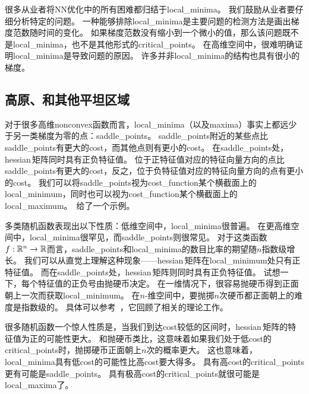 很多从业者将\gls{NN}优化中的所有困难都归结于\gls{local_minima}。
我们鼓励从业者要仔细分析特定的问题。
一种能够排除\gls{local_minima}是主要问题的检测方法是画出梯度范数随时间的变化。
如果梯度范数没有缩小到一个微小的值，那么该问题既不是\gls{local_minima}，也不是其他形式的\gls{critical_points}。
在高维空间中，很难明确证明\gls{local_minima}是导致问题的原因。
许多并非\gls{local_minima}的结构也具有很小的梯度。

\subsection{高原、和其他平坦区域}
\label{sec:plateaus_saddle_points_and_other_flat_regions}
对于很多高维\gls{nonconvex}函数而言，\gls{local_minima}（以及\gls{maxima}）事实上都远少于另一类梯度为零的点：\gls{saddle_points}。
\gls{saddle_points}附近的某些点比\gls{saddle_points}有更大的\gls{cost}，而其他点则有更小的\gls{cost}。
在\gls{saddle_points}处，\gls{hessian}\,矩阵同时具有正负特征值。
位于正特征值对应的特征向量方向的点比\gls{saddle_points}有更大的\gls{cost}，反之，位于负特征值对应的特征向量方向的点有更小的\gls{cost}。
我们可以将\gls{saddle_points}视为\gls{cost_function}某个横截面上的\gls{local_minimum}，同时也可以视为\gls{cost_function}某个横截面上的\gls{local_maximum}。
\,给了一个示例。


多类随机函数表现出以下性质：低维空间中，\gls{local_minima}很普遍。
在更高维空间中，\gls{local_minima}很罕见，而\gls{saddle_points}则很常见。
对于这类函数$f:\mathbb{R}^n \to \mathbb{R}$而言，\gls{saddle_points}和\gls{local_minima}的数目比率的期望随$n$指数级增长。
我们可以从直觉上理解这种现象——\gls{hessian}\,矩阵在\gls{local_minimum}处只有正特征值。
而在\gls{saddle_points}处，\gls{hessian}\,矩阵则同时具有正负特征值。
试想一下，每个特征值的正负号由抛硬币决定。
在一维情况下，很容易抛硬币得到正面朝上一次而获取\gls{local_minimum}。
在$n$-维空间中，要抛掷$n$次硬币都正面朝上的难度是指数级的。 
具体可以参考~\cite{Dauphin-et-al-NIPS2014-small}，它回顾了相关的理论工作。


很多随机函数一个惊人性质是，当我们到达\gls{cost}较低的区间时，\gls{hessian}\,矩阵的特征值为正的可能性更大。
和抛硬币类比，这意味着如果我们处于低\gls{cost}的\gls{critical_points}时，抛掷硬币正面朝上$n$次的概率更大。
这也意味着，\gls{local_minima}具有低\gls{cost}的可能性比高\gls{cost}要大得多。
具有高\gls{cost}的\gls{critical_points}更有可能是\gls{saddle_points}。
具有极高\gls{cost}的\gls{critical_points}就很可能是\gls{local_maxima}了。


